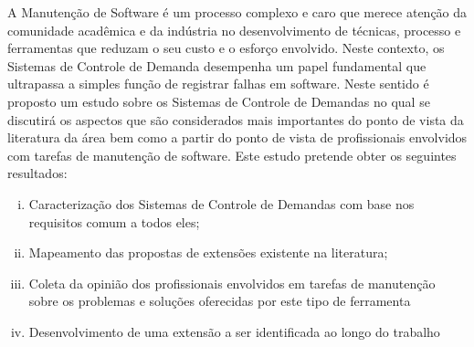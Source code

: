 \documentclass[12pt]{article}
\begin{document}
A Manutenção de Software é um processo complexo e caro que merece atenção da
comunidade acadêmica e da indústria no desenvolvimento de técnicas, processo e
ferramentas que reduzam o seu custo e o esforço envolvido. Neste contexto, os
Sistemas de Controle de Demanda desempenha um papel fundamental que ultrapassa
a simples função de registrar falhas em software. Neste sentido é proposto um estudo sobre os Sistemas de Controle de Demandas no qual se discutirá os aspectos que são considerados mais importantes do ponto de vista da literatura da área bem como a partir do ponto de vista de profissionais envolvidos com tarefas de manutenção de software. Este estudo pretende obter os seguintes resultados:

\begin{enumerate}[(i)]
	\item Caracterização dos Sistemas de Controle de Demandas com base nos requisitos comum a todos eles;
	\item Mapeamento das propostas de extensões existente na literatura;
	\item Coleta da opinião dos profissionais envolvidos em tarefas de manutenção sobre os problemas e soluções oferecidas por este tipo de ferramenta
	\item Desenvolvimento de uma extensão a ser identificada ao longo do trabalho
\end{enumerate}




\end{document}
